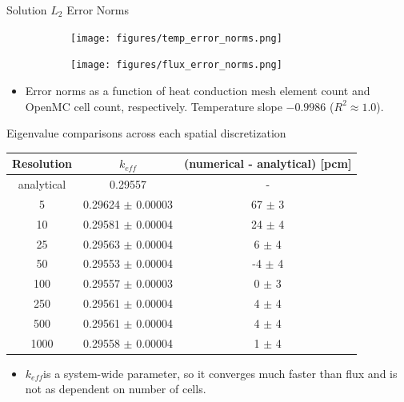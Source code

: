 \documentclass[9pt,t]{beamer}
\newcommand{\keff}{$k_{e\!f\!f}$}
\begin{document}
\begin{frame}{Solution $L_{2}$ Error Norms}
    \pause
    \begin{figure}[T]
        \hspace*{-0.9cm}
        \begin{subfigure}{0.4995\linewidth}
            \texttt{[image: figures/temp\_error\_norms.png]}
        \end{subfigure}\hspace*{0.85cm}
        \begin{subfigure}{0.4995\linewidth}
            \texttt{[image: figures/flux\_error\_norms.png]}
        \end{subfigure}
    \end{figure}
    \begin{itemize}
        \item Error norms as a function of heat conduction mesh element count and OpenMC cell count, respectively. Temperature slope $-0.9986$ ($R^2\approx1.0$).
    \end{itemize}
\end{frame}

\begin{frame}{Eigenvalue comparisons across each spatial discretization}
    \begin{table}[H]
        \centering
        \begin{tabular}{@{}ccc@{}}
            \toprule
            Resolution &  \keff & (numerical - analytical) [pcm]\\
            \midrule
            analytical & 0.29557 & - \\
            \midrule
            5    & 0.29624 $\pm$ 0.00003 & \phantom{-}67 $\pm$ 3 \\
            10   & 0.29581 $\pm$ 0.00004 & \phantom{-}24 $\pm$ 4 \\
            25   & 0.29563 $\pm$ 0.00004 & \phantom{-}6  $\pm$ 4 \\
            50   & 0.29553 $\pm$ 0.00004 &           -4  $\pm$ 4 \\
            100  & 0.29557 $\pm$ 0.00003 & \phantom{-}0  $\pm$ 3 \\
            250  & 0.29561 $\pm$ 0.00004 & \phantom{-}4  $\pm$ 4 \\
            500  & 0.29561 $\pm$ 0.00004 & \phantom{-}4  $\pm$ 4 \\
            1000 & 0.29558 $\pm$ 0.00004 & \phantom{-}1  $\pm$ 4 \\
        \bottomrule
        \end{tabular}
    \end{table}
    \begin{itemize}
        \item<2-> \keff is a system-wide parameter, so it converges much faster than flux and is not as dependent on number of cells.
    \end{itemize}
\end{frame}
\end{document}
